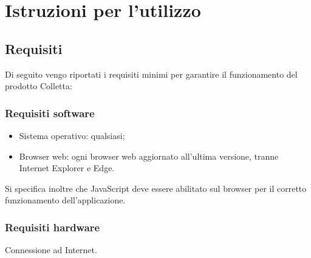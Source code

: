 \section{Istruzioni per l'utilizzo}

    \subsection{Requisiti}
    Di seguito vengo riportati i requisiti minimi per garantire il funzionamento del prodotto Colletta:

    \subsubsection{Requisiti software}
    \begin{itemize}
    \item {Sistema operativo:} qualsiasi;
    \item {Browser web:} ogni browser web aggiornato all'ultima versione, tranne Internet Explorer e Edge.
    \end{itemize}
    Si specifica inoltre che JavaScript deve essere abilitato sul browser per il corretto funzionamento dell’applicazione.

    \subsubsection{Requisiti hardware}
    Connessione ad Internet.
    \newpage
